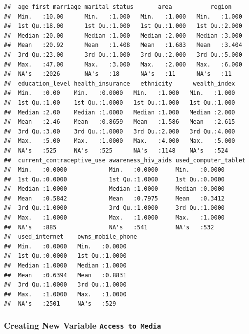 \documentclass[
]{article}
\begin{document}
\begin{verbatim}
##  age_first_marriage marital_status       area           region     
##  Min.   :10.00      Min.   :1.000   Min.   :1.000   Min.   :1.000  
##  1st Qu.:18.00      1st Qu.:1.000   1st Qu.:1.000   1st Qu.:2.000  
##  Median :20.00      Median :1.000   Median :2.000   Median :3.000  
##  Mean   :20.92      Mean   :1.408   Mean   :1.683   Mean   :3.404  
##  3rd Qu.:23.00      3rd Qu.:1.000   3rd Qu.:2.000   3rd Qu.:5.000  
##  Max.   :47.00      Max.   :3.000   Max.   :2.000   Max.   :6.000  
##  NA's   :2026       NA's   :18      NA's   :11      NA's   :11     
##  education_level health_insurance   ethnicity      wealth_index  
##  Min.   :0.00    Min.   :0.0000   Min.   :1.000   Min.   :1.000  
##  1st Qu.:1.00    1st Qu.:1.0000   1st Qu.:1.000   1st Qu.:1.000  
##  Median :2.00    Median :1.0000   Median :1.000   Median :2.000  
##  Mean   :2.46    Mean   :0.8659   Mean   :1.586   Mean   :2.615  
##  3rd Qu.:3.00    3rd Qu.:1.0000   3rd Qu.:2.000   3rd Qu.:4.000  
##  Max.   :5.00    Max.   :1.0000   Max.   :4.000   Max.   :5.000  
##  NA's   :525     NA's   :525      NA's   :1148    NA's   :524    
##  current_contraceptive_use awareness_hiv_aids used_computer_tablet
##  Min.   :0.0000            Min.   :0.0000     Min.   :0.0000      
##  1st Qu.:0.0000            1st Qu.:1.0000     1st Qu.:0.0000      
##  Median :1.0000            Median :1.0000     Median :0.0000      
##  Mean   :0.5842            Mean   :0.7975     Mean   :0.3412      
##  3rd Qu.:1.0000            3rd Qu.:1.0000     3rd Qu.:1.0000      
##  Max.   :1.0000            Max.   :1.0000     Max.   :1.0000      
##  NA's   :885               NA's   :541        NA's   :532         
##  used_internet    owns_mobile_phone
##  Min.   :0.0000   Min.   :0.0000   
##  1st Qu.:0.0000   1st Qu.:1.0000   
##  Median :1.0000   Median :1.0000   
##  Mean   :0.6394   Mean   :0.8831   
##  3rd Qu.:1.0000   3rd Qu.:1.0000   
##  Max.   :1.0000   Max.   :1.0000   
##  NA's   :2501     NA's   :529
\end{verbatim}

\hypertarget{creating-new-variable-access-to-media}{%
\subsubsection{\texorpdfstring{Creating New Variable
\texttt{Access\ to\ Media}}{Creating New Variable Access to Media}}\label{creating-new-variable-access-to-media}}
\end{document}
